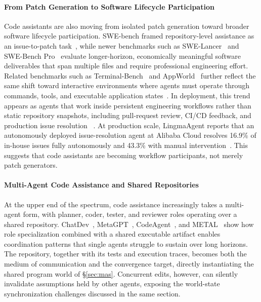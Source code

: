 \paragraph{From Patch Generation to Software Lifecycle Participation}
Code assistants are also moving from isolated patch generation toward broader
software lifecycle participation. SWE-bench framed repository-level assistance
as an issue-to-patch task~\citep{jimenez2023swe}, while newer benchmarks such as
SWE-Lancer~\citep{miserendino2025swe} and SWE-Bench Pro~\citep{deng2025swe} evaluate longer-horizon, economically meaningful
software deliverables that span multiple files and require professional
engineering effort. Related benchmarks
such as Terminal-Bench~\citep{merrill2026terminal} and AppWorld~\citep{trivedi2024appworld} further reflect the same shift toward
interactive environments where agents must operate through commands, tools, and
executable application states~\citep{xie2024osworld,yao2025taubench}. In deployment, this trend appears as agents that work
inside persistent engineering workflows rather than static repository snapshots,
including pull-request review, CI/CD feedback, and production issue resolution
~\citep{tang2024codeagent,Baqar_2025}. At production scale,
LingmaAgent reports that an autonomously deployed issue-resolution agent at
Alibaba Cloud resolves 16.9\% of in-house issues fully autonomously and 43.3\%
with manual intervention~\citep{ma2025alibaba,li2026advances}. This suggests
that code assistants are becoming workflow participants, not merely patch
generators.

\paragraph{Multi-Agent Code Assistance and Shared Repositories}
At the upper end of the spectrum, code assistance increasingly takes a multi-agent form, with planner, coder, tester, and reviewer roles operating over a shared repository.
ChatDev~\cite{Qian2023ChatDev}, MetaGPT~\cite{Hong2023MetaGPT},
CodeAgent~\cite{zhang2024codeagent}, and METAL~\cite{li2025metal} show how role specialization combined with a shared executable artifact enables coordination patterns that single agents struggle to sustain over long horizons.
The repository, together with its tests and execution traces, becomes both the medium of communication and the convergence target, directly instantiating the shared program world of \S\ref{sec:mas}.
Concurrent edits, however, can silently invalidate assumptions held by other agents, exposing the world-state synchronization challenges discussed in the same section.

